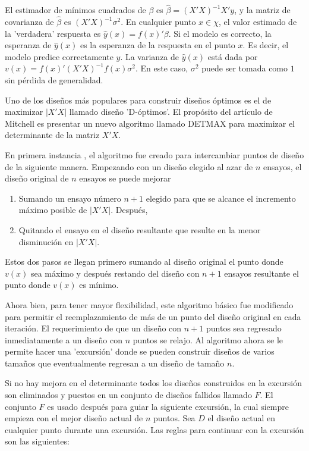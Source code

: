 El estimador de mínimos cuadrados de $\beta$ es $\hat{\beta} = (X'X)^{-1} X'y$, y la matriz de covarianza de $\hat{\beta}$ es $(X'X)^{-1} \sigma^{2}$. En cualquier punto $x \in \chi$, el valor estimado de la 'verdadera' respuesta es $\hat{y} (x) = f(x)' \beta$. Si el modelo es correcto, la esperanza de $\hat{y}(x)$ es la esperanza de la respuesta en el punto $x$. Es decir, el modelo predice correctamente $y$. La varianza de $\hat{y}(x)$ está dada por $v(x) = f(x)' (X'X)^{-1} f(x) \sigma^{2}$. En este caso, $\sigma^{2}$ puede ser tomada como $1$ sin pérdida de generalidad. 

Uno de los diseños más populares para construir diseños óptimos es el de maximizar $|X'X|$ llamado diseño 'D-óptimos'.  El propósito del artículo de Mitchell es presentar un nuevo algoritmo llamado DETMAX para maximizar el determinante de la matriz $X'X$. 

En primera instancia , el algoritmo fue creado para intercambiar puntos de diseño de la siguiente manera. Empezando con un diseño elegido al azar de $n$ ensayos, el diseño original de $n$ ensayos se puede mejorar 


\begin{enumerate}
	\item Sumando un ensayo número $n+1$ elegido para que se alcance el incremento máximo posible de $|X'X|$. Después, 
	\item Quitando el ensayo en el diseño resultante que resulte en la menor disminución en  $|X'X|$. 
\end{enumerate}

Estos dos pasos se llegan primero sumando al diseño original el punto donde $v(x)$ sea máximo y después restando del diseño con $n+1$ ensayos resultante el punto donde $v(x)$ es mínimo.


Ahora bien, para tener mayor flexibilidad, este algoritmo básico fue modificado para permitir el reemplazamiento de más de un punto del diseño original en cada iteración. El requerimiento de que un diseño con $n+1$ puntos sea regresado inmediatamente a un diseño con $n$ puntos se relajo. Al algoritmo ahora se le permite hacer una 'excursión' donde se pueden construir diseños de varios tamaños que eventualmente regresan a un diseño de tamaño $n$.  

Si no hay mejora en el determinante todos los diseños construidos en la excursión son eliminados y puestos en un conjunto de diseños fallidos llamado $F$. El conjunto $F$ es usado después para guiar la siguiente excursión, la cual siempre empieza con el mejor diseño actual de $n$ puntos. 
Sea $D$ el diseño actual en cualquier punto durante una excursión. Las reglas para continuar con la excursión son las siguientes:

